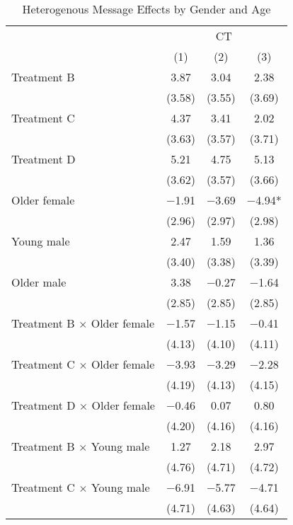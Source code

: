 \documentclass[12pt, a4paper]{article}
\begin{document}
\begin{table}

\caption{\label{tab:reg-interaction}Heterogenous Message Effects by Gender and Age}
\centering
\fontsize{9}{11}\selectfont
\begin{threeparttable}
\begin{tabular}[t]{lccc}
\toprule
\multicolumn{1}{c}{ } & \multicolumn{3}{c}{CT} \\
\cmidrule(l{3pt}r{3pt}){2-4}
  & (1) & (2) & (3)\\
\midrule
Treatment B & \num{3.87} & \num{3.04} & \num{2.38}\\
 & (\num{3.58}) & (\num{3.55}) & (\num{3.69})\\
Treatment C & \num{4.37} & \num{3.41} & \num{2.02}\\
 & (\num{3.63}) & (\num{3.57}) & (\num{3.71})\\
Treatment D & \num{5.21} & \num{4.75} & \num{5.13}\\
 & (\num{3.62}) & (\num{3.57}) & (\num{3.66})\\
Older female & \num{-1.91} & \num{-3.69} & \num{-4.94}*\\
 & (\num{2.96}) & (\num{2.97}) & (\num{2.98})\\
Young male & \num{2.47} & \num{1.59} & \num{1.36}\\
 & (\num{3.40}) & (\num{3.38}) & (\num{3.39})\\
Older male & \num{3.38} & \num{-0.27} & \num{-1.64}\\
 & (\num{2.85}) & (\num{2.85}) & (\num{2.85})\\
Treatment B $\times$ Older female & \num{-1.57} & \num{-1.15} & \num{-0.41}\\
 & (\num{4.13}) & (\num{4.10}) & (\num{4.11})\\
Treatment C $\times$ Older female & \num{-3.93} & \num{-3.29} & \num{-2.28}\\
 & (\num{4.19}) & (\num{4.13}) & (\num{4.15})\\
Treatment D $\times$ Older female & \num{-0.46} & \num{0.07} & \num{0.80}\\
 & (\num{4.20}) & (\num{4.16}) & (\num{4.16})\\
Treatment B $\times$ Young male & \num{1.27} & \num{2.18} & \num{2.97}\\
 & (\num{4.76}) & (\num{4.71}) & (\num{4.72})\\
Treatment C $\times$ Young male & \num{-6.91} & \num{-5.77} & \num{-4.71}\\
 & (\num{4.71}) & (\num{4.63}) & (\num{4.64})\\

\end{tabular}
\end{threeparttable}
\end{table}
\end{document}

